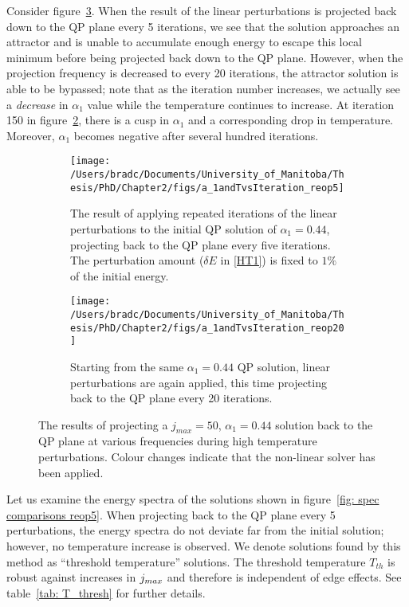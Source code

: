 \documentclass[../PhD.tex]{subfiles}
\begin{document}
Consider figure~\ref{fig: reop comparisons}. When the result of the linear perturbations is projected back down to the QP plane every 5 iterations, we see that the solution approaches an attractor and is unable to accumulate enough energy to escape this local minimum before being projected back down to the QP plane. However, when the projection frequency is decreased to every 20 iterations, the attractor solution is able to be bypassed; note that as the iteration number increases, we actually see a \emph{decrease} in $\alpha_1$ value while the temperature continues to increase. At iteration 150 in figure~\ref{fig: a_1andTa.2reop20}, there is a cusp in $\alpha_1$ and a corresponding drop in temperature. Moreover, $\alpha_1$ becomes negative after several hundred iterations.

\begin{figure}[h]
	\centering
	\begin{subfigure}[t]{0.45\textwidth}
		\texttt{[image: /Users/bradc/Documents/University\_of\_Manitoba/Thesis/PhD/Chapter2/figs/a\_1andTvsIteration\_reop5]}
		\caption{The result of applying repeated iterations of the linear perturbations to the initial QP solution of $\alpha_1=0.44$, projecting back to the QP plane every five iterations. The perturbation amount ($\delta E$ in \eqref{HT1}) is fixed to $1\%$ of the initial energy.}
		\label{fig: a_1andTa0.2reop5}
	\end{subfigure}
	\:
	\begin{subfigure}[t]{0.45\textwidth}
		\texttt{[image: /Users/bradc/Documents/University\_of\_Manitoba/Thesis/PhD/Chapter2/figs/a\_1andTvsIteration\_reop20]}
		\caption{Starting from the same $\alpha_1=0.44$ QP solution, linear perturbations are again applied, this time projecting back to the QP plane every 20 iterations.}
		\label{fig: a_1andTa.2reop20}
	\end{subfigure}
	\caption[High temperature solutions resulting from projecting back to the QP solution plane at various frequencies]{The results of projecting a $j_{max}=50$, $\alpha_1 = 0.44$ solution back to the QP plane at various frequencies during high temperature perturbations. Colour changes indicate that the non-linear solver has been applied.}
	\label{fig: reop comparisons}
\end{figure}

Let us examine the energy spectra of the solutions shown in figure~\ref{fig: spec comparisons reop5}. When projecting back to the QP plane every 5 perturbations, the energy spectra do not deviate far from the initial solution; however, no temperature increase is observed. We denote solutions found by this method as ``threshold temperature'' solutions. The threshold temperature $T_{th}$ is robust against increases in $j_{max}$ and therefore is independent of edge effects. See table~\ref{tab: T_thresh} for further details.
\end{document}

